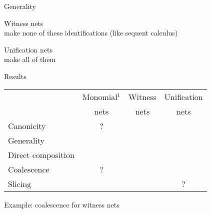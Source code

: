 \documentclass[xcolor=dvipsnames]{beamer}
\makeatletter
\newcommand\+{+}
\renewcommand\*{\times}
\newcommand\dual[1]{\overline{#1}}
\newcommand\seq[2]{{\vdash\,}#1,#2}
\newcommand\xmark{{\color{darkred}\ding{55}}}
\newcommand\vmark{{\color{darkgreen}\ding{51}}}
\newcommand\Qrr{\!\!\scriptstyle\qrr}
\newcommand\qrr[1]{
  \ifx#1+\expandafter\@qrr\else
  \ifx#1*\*\mathrm R\else
  \ifx#1!\forall\mathrm R\else
  \ifx#1?\expandafter\@@qrr\else
  \ifx#11\mathrm{ax}\else
  \ifx#1.\mathrm{cut}\else
  #1\mathrm R
  \fi\fi\fi\fi\fi\fi
}
\newcommand\@qrr[1]{+\mathrm R,#1}
\newcommand\@@qrr[1]{\exists\mathrm R,#1}
\newcommand\xs{(x,\!s)}
\newcommand\xt{(x,\!t)}
\newcommand\xy{(x,\!y)}
\newcommand\zs{(z,\!s)}
\newcommand\zt{(z,\!t)}
\makeatother
\begin{document}
\begin{frame}{Generality}

{\color{darkred}Witness nets} 
\\
make none of these identifications (like {\color{darkred}sequent calculus})

\bigskip
\bigskip

{\color{darkred}Unification nets}
\\
make all of them

\end{frame}
\begin{frame}{Results}

\begin{tabular}{@{}l@{}ccc@{}}
  &	Monomial$^1$ & Witness & Unification
\\ & nets & nets & nets
\\\hline
   Canonicity          &    ?   & \vmark & \vmark
\\ Generality          & \xmark & \xmark & \vmark
\\ Direct composition  & \xmark & \vmark & \vmark
\\ Coalescence         &    ?   & \vmark & \vmark
\\ Slicing             & \vmark & \vmark &   ?
\end{tabular}  


\end{frame}
\begin{frame}

\begin{center}
Example: coalescence for witness nets
\end{center}

\end{frame}
\end{document}
